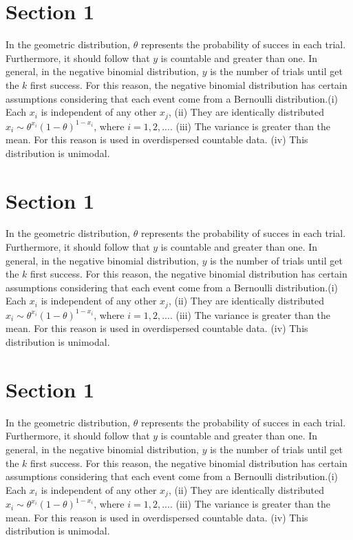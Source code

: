\documentclass[11pt, a4paper, top=3.5cm,bottom=3.5cm, right=3cm,left=3cm]{SimpleNotes}
\begin{document}
\section{Section 1}
In the geometric distribution, $\theta$ represents the probability of succes in each trial. Furthermore, it should follow that $y$ is countable and greater than one. In general, in the negative binomial distribution, $y$ is the number of trials until get the $k$ first success. For this reason, the negative binomial distribution has certain assumptions considering that each event come from a Bernoulli distribution.(i) Each $x_i$ is independent of any other $x_j$, (ii) They are identically distributed $x_i\sim\theta^{x_i}(1-\theta)^{1-x_i}$, where $i =1,2,...$. (iii) The variance is greater than the mean. For this reason is used in overdispersed countable data. (iv) This distribution is unimodal.
\section{Section 1}
In the geometric distribution, $\theta$ represents the probability of succes in each trial. Furthermore, it should follow that $y$ is countable and greater than one. In general, in the negative binomial distribution, $y$ is the number of trials until get the $k$ first success. For this reason, the negative binomial distribution has certain assumptions considering that each event come from a Bernoulli distribution.(i) Each $x_i$ is independent of any other $x_j$, (ii) They are identically distributed $x_i\sim\theta^{x_i}(1-\theta)^{1-x_i}$, where $i =1,2,...$. (iii) The variance is greater than the mean. For this reason is used in overdispersed countable data. (iv) This distribution is unimodal.
\section{Section 1}
In the geometric distribution, $\theta$ represents the probability of succes in each trial. Furthermore, it should follow that $y$ is countable and greater than one. In general, in the negative binomial distribution, $y$ is the number of trials until get the $k$ first success. For this reason, the negative binomial distribution has certain assumptions considering that each event come from a Bernoulli distribution.(i) Each $x_i$ is independent of any other $x_j$, (ii) They are identically distributed $x_i\sim\theta^{x_i}(1-\theta)^{1-x_i}$, where $i =1,2,...$. (iii) The variance is greater than the mean. For this reason is used in overdispersed countable data. (iv) This distribution is unimodal.



%
%
\end{document}
